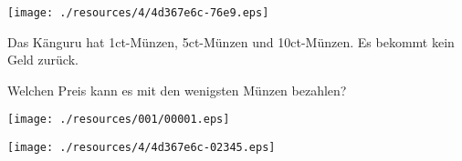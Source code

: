 \begin{center}
\texttt{[image: ./resources/4/4d367e6c-76e9.eps]}
\end{center}

Das Känguru hat 1ct-Münzen, 5ct-Münzen und 10ct-Münzen. Es bekommt kein Geld zurück.\par Welchen Preis kann es mit den wenigsten Münzen bezahlen?

\begin{center}
\texttt{[image: ./resources/001/00001.eps]}
\end{center}

\begin{center}
\texttt{[image: ./resources/4/4d367e6c-02345.eps]}
\end{center}
